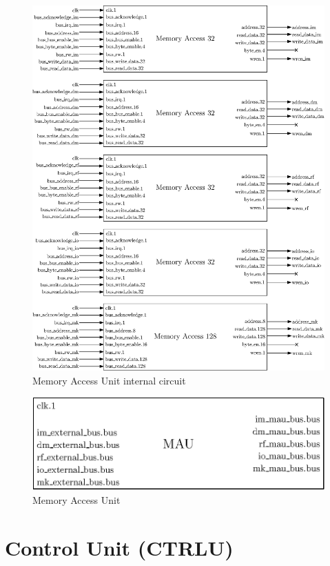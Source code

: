 \begin{figure}[ht!]
    \center
    \includegraphics[width=\linewidth]{"Chapter6-MAU_CTRLU/res/mau_in"}
    \caption{Memory Access Unit internal circuit}
    \label{fig:mau_in}
\end{figure}

\begin{figure}[ht!]
    \center
    \includegraphics[scale=0.8]{"Chapter6-MAU_CTRLU/res/mau"}
    \caption{Memory Access Unit}
    \label{fig:mau}
\end{figure}

\section{Control Unit (CTRLU)}

